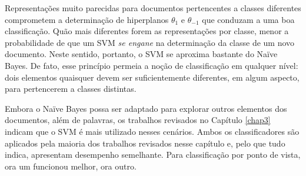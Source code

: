 

Representações muito parecidas para documentos pertencentes a classes diferentes comprometem a determinação de hiperplanos \ensuremath{\theta_1} e \ensuremath{\theta_{-1}} que conduzam a uma boa classificação. Quão mais diferentes forem as representações por classe, menor a probabilidade de que um SVM \emph{se engane} na determinação da classe de um novo documento. Neste sentido, portanto, o SVM se aproxima bastante do Naïve Bayes. De fato, esse princípio permeia a noção de classificação em qualquer nível: dois elementos quaisquer devem ser suficientemente diferentes, em algum aspecto, para pertencerem a classes distintas.

Embora o Naïve Bayes possa ser adaptado para explorar outros elementos dos documentos, além de palavras, os trabalhos revisados no Capítulo \ref{chap3} indicam que o SVM é mais utilizado nesses cenários. Ambos os classificadores são aplicados pela maioria dos trabalhos revisados nesse capítulo e, pelo que tudo indica, apresentam desempenho semelhante. Para classificação por ponto de vista, ora um funcionou melhor, ora outro. %



